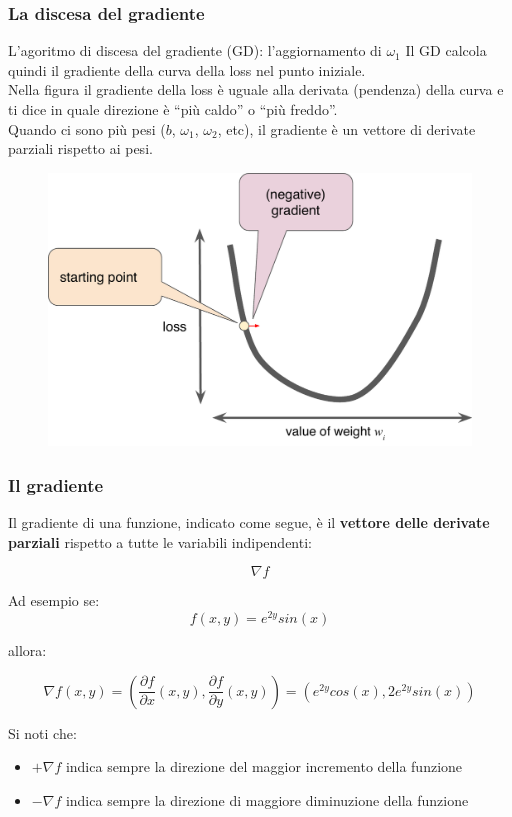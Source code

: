 \begin{frame}

	\frametitle{La discesa del gradiente}

	\begin{block}{L'agoritmo di discesa del gradiente (GD): l'aggiornamento di $\omega_1$}
		Il GD calcola quindi il gradiente della curva della loss nel punto iniziale.\\
		Nella figura il gradiente della loss è uguale alla derivata (pendenza) della curva e ti dice in quale direzione è ``più caldo'' o ``più freddo''.\\
		\vspace{1mm}
		Quando ci sono più pesi ($b$, $\omega_1$, $\omega_2$, etc), il gradiente è un vettore di derivate parziali rispetto ai pesi.

		\begin{figure}[!htbp]
			\centering
			\includegraphics[width=0.45\linewidth]{images/supervised/training_reducing_loss/GradientDescentNegativeGradient.pdf}
		\end{figure}
	\end{block}

\end{frame}


\begin{frame}

	\frametitle{Il gradiente}

		Il gradiente di una funzione, indicato come segue, è il 	\textbf{vettore delle derivate parziali} rispetto a tutte le variabili indipendenti:

		$$\nabla f$$

		Ad esempio se:
		$$f(x, y) = e^{2y}sin(x)$$

		allora:

		$$\nabla f(x, y)= \left( \frac{\partial f}{\partial x} (x, y), \frac{\partial f}{\partial y} (x, y)\right) = \left(e^{2y}cos(x), 2e^{2y}sin(x)\right)$$

		Si noti che:
		\begin{itemize}
			\item $+\nabla f$ indica sempre la direzione del maggior incremento della funzione
			\item $-\nabla f$ indica sempre la direzione di maggiore diminuzione della funzione
		\end{itemize}

\end{frame}


